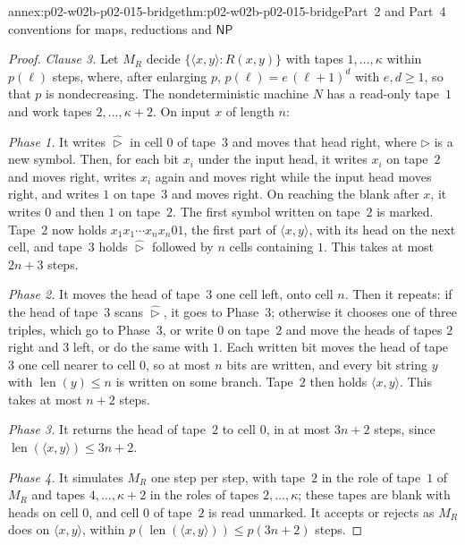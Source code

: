 \begin{annexitem}{annex:p02-w02b-p02-015-bridge}{thm:p02-w02b-p02-015-bridge}{Part~2 and Part~4 conventions for maps, reductions and \(\mathsf{NP}\)}
\begin{proof}
\emph{Clause 3.}  Let \(M_R\) decide \(\{\langle x,y\rangle:R(x,y)\}\) with
tapes \(1,\ldots,\kappa\) within \(p(\ell)\) steps, where, after enlarging
\(p\), \(p(\ell)=e\,(\ell+1)^d\) with \(e,d\geq1\), so that \(p\) is
nondecreasing.  The nondeterministic machine \(N\) has a read-only tape~\(1\)
and work tapes \(2,\ldots,\kappa+2\).  On input \(x\) of length \(n\):

\emph{Phase 1.}  It writes \(\hat{\triangleright}\) in cell \(0\) of
tape~\(3\) and moves that head right, where \(\triangleright\) is a new
symbol.  Then, for each bit \(x_i\) under the input head, it writes \(x_i\)
on tape~\(2\) and moves right, writes \(x_i\) again and moves right while the
input head moves right, and writes \(1\) on tape~\(3\) and moves right.  On
reaching the blank after \(x\), it writes \(0\) and then \(1\) on tape~\(2\).
The first symbol written on tape~\(2\) is marked.  Tape~\(2\) now holds
\(x_1x_1\cdots x_nx_n01\), the first part of \(\langle x,y\rangle\), with
its head on the next cell, and tape~\(3\) holds \(\hat\triangleright\)
followed by \(n\) cells containing \(1\).  This takes at most \(2n+3\) steps.

\emph{Phase 2.}  It moves the head of tape~\(3\) one cell left, onto cell
\(n\).  Then it repeats: if the head of tape~\(3\) scans
\(\hat\triangleright\), it goes to Phase~3; otherwise it chooses one of three
triples, which go to Phase~3, or write \(0\) on tape~\(2\) and move the heads
of tapes \(2\) right and \(3\) left, or do the same with \(1\).  Each written
bit moves the head of tape~\(3\) one cell nearer to cell \(0\), so at most
\(n\) bits are written, and every bit string \(y\) with
\(\operatorname{len}(y)\leq n\) is written on some branch.  Tape~\(2\) then
holds \(\langle x,y\rangle\).  This takes at most \(n+2\) steps.

\emph{Phase 3.}  It returns the head of tape~\(2\) to cell \(0\), in at most
\(3n+2\) steps, since \(\operatorname{len}(\langle x,y\rangle)\leq 3n+2\).

\emph{Phase 4.}  It simulates \(M_R\) one step per step, with tape~\(2\) in
the role of tape~\(1\) of \(M_R\) and tapes \(4,\ldots,\kappa+2\) in the
roles of tapes \(2,\ldots,\kappa\); these tapes are blank with heads on cell
\(0\), and cell \(0\) of tape~\(2\) is read unmarked.  It accepts or rejects
as \(M_R\) does on \(\langle x,y\rangle\), within
\(p(\operatorname{len}(\langle x,y\rangle))\leq p(3n+2)\) steps.


\end{proof}
\end{annexitem}
